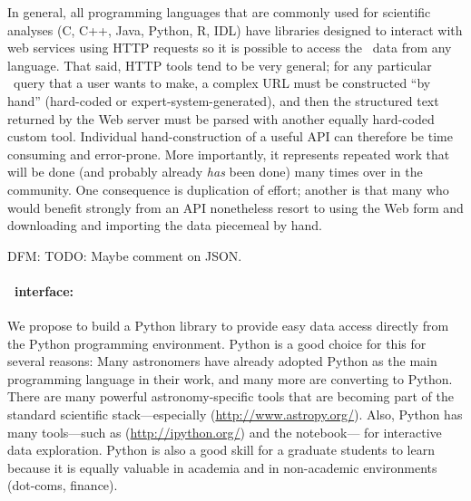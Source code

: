 \documentclass[letterpaper,12pt,preprint]{hack_aastex}
\newcommand{\kplr}{\package{kplr}}
\begin{document}
In general, all programming languages that are commonly used for scientific
analyses (C, C++, Java, Python, R, IDL) have
libraries designed to interact with web services using HTTP requests so it is
possible to access the \Kepler\ data from any language.
That said, HTTP tools tend to be very general;
for any particular \Kepler\ query that a user wants to make,
a complex URL must be constructed ``by hand'' (hard-coded or
expert-system-generated), and then the structured text returned by the Web server must be
parsed with another equally hard-coded custom tool.
Individual hand-construction of a useful API can therefore
be time consuming and error-prone.
More importantly, it represents repeated work that will be done (and probably
already \emph{has} been done) many times over in the community.
One consequence is duplication of effort; another is that many who would
benefit strongly from an API nonetheless resort to using the Web form
and downloading and importing the data piecemeal by hand.

DFM:  TODO:  Maybe comment on JSON.

\paragraph{\kplr\ interface:}
We propose to build a Python library to provide easy data access directly
from the Python programming environment.
Python is a good choice for this for several reasons:
Many astronomers have already adopted Python as the main
programming language in their work, and many more are
converting to Python.
There are many powerful astronomy-specific tools that are becoming part of
the standard scientific stack---especially 
 (\url{http://www.astropy.org/}).
Also, Python has many tools---such as 
 (\url{http://ipython.org/}) and the  notebook---%
for interactive data exploration.
Python is also a good skill for a graduate students to learn
because it is equally valuable in academia and in non-academic
environments (dot-coms, finance).
\end{document}
